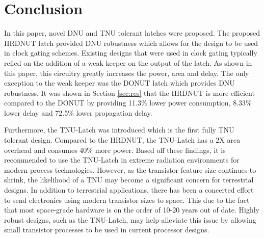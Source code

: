 \section{Conclusion} \label{sec:conc}
In this paper, novel DNU and TNU tolerant latches were proposed. The proposed HRDNUT latch provided DNU robustness which allows for the design to be used in clock gating schemes. Existing designs that were used in clock gating typically relied on the addition of a weak keeper on the output of the latch. As shown in this paper, this circuitry greatly increases the power, area and delay. The only exception to the weak keeper was the DONUT latch which provides DNU robustness. It was shown in Section \ref{sec:res} that the HRDNUT is more efficient compared to the DONUT by providing 11.3\% lower power consumption, 8.33\% lower delay and 72.5\% lower propagation delay. 

Furthermore, the TNU-Latch was introduced which is the first fully TNU tolerant design. Compared to the HRDNUT, the TNU-Latch has a 2X area overhead and consumes 40\% more power. Based off these findings, it is recommended to use the TNU-Latch in extreme radiation environments for modern process technologies. However, as the transistor feature size continues to shrink, the likelihood of a TNU may become a significant concern for terrestrial designs. In addition to terrestrial applications, there has been a concerted effort to send electronics using modern transistor sizes to space. This due to the fact that most space-grade hardware is on the order of 10-20 years out of date. Highly robust designs, such as the TNU-Latch, may help alleviate this issue by allowing small transistor processes to be used in current processor designs.